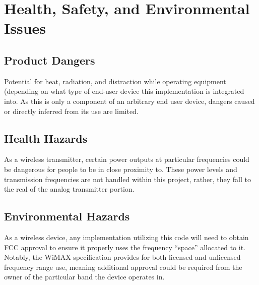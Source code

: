 \section{Health, Safety, and Environmental Issues}

\subsection{Product Dangers}

Potential for heat, radiation, and distraction while operating equipment (depending on what type of end-user device this implementation is integrated into. As this is only a component of an arbitrary end user device, dangers caused or directly inferred from its use are limited.

\subsection{Health Hazards}

As a wireless transmitter, certain power outputs at particular frequencies could be dangerous for people to be in close proximity to. These power levels and transmission frequencies are not handled within this project, rather, they fall to the real of the analog transmitter portion.

\subsection{Environmental Hazards}

As a wireless device, any implementation utilizing this code will need to obtain FCC approval to ensure it properly uses the frequency ``space'' allocated to it. Notably, the WiMAX specification provides for both licensed and unlicensed frequency range use, meaning additional approval could be required from the owner of the particular band the device operates in.